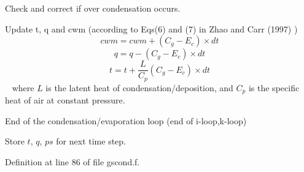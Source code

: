\begin{DoxyEnumerate}
\begin{DoxyItemize}
\item Check and correct if over condensation occurs.
\item Update t, q and cwm (according to Eqs(6) and (7) in Zhao and Carr (1997) \cite{zhao_and_carr_1997}) \[ cwm=cwm+(C_{g}-E_{c})\times dt \] \[ q=q-(C_{g}-E_{c})\times dt \] \[ t=t+\frac{L}{C_{p}}(C_{g}-E_{c})\times dt \] ~\newline
 where $L$ is the latent heat of condensation/deposition, and $C_{p}$ is the specific heat of air at constant pressure.
\end{DoxyItemize}
\item End of the condensation/evaporation loop (end of i-\/loop,k-\/loop)
\item Store $t$, $q$, $ps$ for next time step. 
\end{DoxyEnumerate}

Definition at line 86 of file gscond.\+f.

